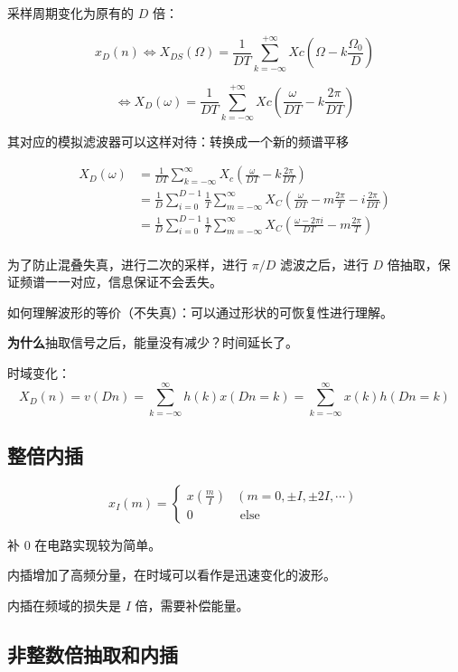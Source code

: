 \documentclass[cn,11pt,chinese,black,simple]{elegantbook}
\begin{document}
采样周期变化为原有的 \(D\) 倍：

\[x_{D}(n) \Leftrightarrow X_{D S}(\Omega)=\frac{1}{D T} \sum_{k=-\infty}^{+\infty} X c\left(\Omega-k \frac{\Omega_{0}}{D}\right) \] 

\[\Leftrightarrow X_{D}(\omega)=\frac{1}{D T} \sum_{k=-\infty}^{+\infty} X c\left(\frac{\omega}{D T}-k \frac{2 \pi}{D T}\right)\] 

其对应的模拟滤波器可以这样对待：转换成一个新的频谱平移 

\[\begin{aligned}
    X_D(\omega) &= \frac{1}{DT} \sum_{k = -\infty}^\infty X_c(\frac{\omega}{DT} - k \frac{2\pi}{DT}) \\ 
    &= \frac{1}{D} \sum_{i = 0}^{D-1} \frac{1}{T} \sum_{m=-\infty}^\infty X_C (\frac{\omega}{DT} - m \frac{2\pi}{T} - i \frac{2 \pi}{DT}) \\ 
    &= \frac{1}{D} \sum_{i = 0}^{D-1} \frac{1}{T} \sum_{m=-\infty}^\infty X_C (\frac{\omega - 2 \pi i}{DT} - m \frac{2\pi}{T}) \\ 
\end{aligned}\]

为了防止混叠失真，进行二次的采样，进行 \(\pi/D\) 滤波之后，进行 \(D\) 倍抽取，保证频谱一一对应，信息保证不会丢失。

如何理解波形的等价（不失真）：可以通过形状的可恢复性进行理解。

\textbf{为什么}抽取信号之后，能量没有减少？时间延长了。

时域变化：  \[X_D(n) = v (D n) = \sum_{k=-\infty}^\infty h(k) x(Dn = k) = \sum_{k=-\infty}^\infty x(k) h(Dn = k)\]

\subsection{整倍内插}

\[x_{I}(m)=\left\{\begin{array}{cc}
    x\left(\frac{m}{I}\right) & (m=0, \pm I, \pm 2 I, \cdots) \\
    0 & \text { else }
\end{array}\right.\]

补 0 在电路实现较为简单。

内插增加了高频分量，在时域可以看作是迅速变化的波形。

内插在频域的损失是 \(I\) 倍，需要补偿能量。

\subsection{非整数倍抽取和内插}
\end{document}
